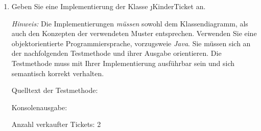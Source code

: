 \documentclass{lehramt-informatik-aufgabe}
\begin{document}
\begin{enumerate}

\item Geben Sie eine Implementierung der Klasse \j{KinderTicket} an.

\begin{liAntwort}
\end{liAntwort}

\emph{Hinweis:} Die Implementierungen \emph{müssen} sowohl dem
Klassendiagramm, als auch den Konzepten der verwendeten Muster
entsprechen. Verwenden Sie eine objektorientierte Programmiersprache,
vorzugsweie \emph{Java}. Sie müssen sich an der nachfolgenden
Testmethode und ihrer Ausgabe orientieren. Die Testmethode muss mit
Ihrer Implementierung ausführbar sein und sich semantisch korrekt
verhalten.

Quelltext der Testmethode:


Konsolenausgabe:

Anzahl verkaufter Tickets: 2

\end{enumerate}
\end{document}

